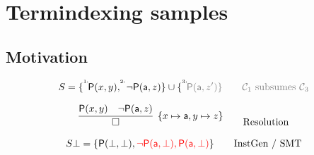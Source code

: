 
\section{Termindexing samples}
\subsection{Motivation}



\begin{example}
	\begin{gather*}
	S = \{ \TI{1}\mP(x,y), \TI{2}\lnot \mP(\ma,z)\} \cup \{\TI{3}\colG\mP(\ma,z') \}
	\tag*{\( \mcC_1 \) subsumes \( \mcC_3 \)}
	\\[0.7em]
	\infer[\{x\mapsto\ma,y\mapsto z\}]
	{\square}
	{\mP(x,y) & \lnot \mP(\ma,z)}
	\tag*{Resolution}
	\\[0.7em]
	S\bot = \{ \mP(\bot,\bot), {\colLo\lnot \mP(\ma,\bot), \mP(\ma,\bot)} \}
	\tag*{InstGen / SMT}
	\end{gather*}
\end{example}

